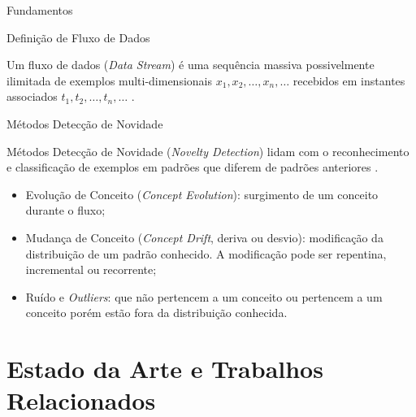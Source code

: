 \documentclass[aspectratio=1610,10pt]{beamer}
\begin{document}
\begin{frame}[fragile]{Fundamentos}
  \begin{block}{Definição de Fluxo de Dados}
    
    \vspace{1mm}

    Um fluxo de dados (\textit{Data Stream}) é uma sequência massiva possivelmente
    ilimitada de exemplos multi-dimensionais $x_1, x_2, \dots, x_n, \dots$
    recebidos em instantes associados $t_1, t_2, \dots, t_n, \dots$
    \cite{Aggarwal2003}.
  \end{block}

  \begin{alertblock}{Métodos Detecção de Novidade}
    
    \vspace{1mm}
    Métodos Detecção de Novidade (\emph{Novelty Detection}) lidam com o reconhecimento e
    classificação de exemplos em padrões que diferem de padrões anteriores
    \cite{Gama2010}.
    \begin{itemize}%
      
      \item Evolução de Conceito (\emph{Concept Evolution}): surgimento de um conceito durante
      o fluxo;
      
      \item Mudança de Conceito (\emph{Concept Drift}, deriva ou desvio): modificação da
      distribuição de um padrão conhecido. A modificação pode ser repentina,
      incremental ou recorrente;
      
      \item Ruído e \emph{Outliers}: que não pertencem a um conceito ou
      pertencem a um conceito porém estão fora da distribuição conhecida.
      
    \end{itemize}
  \end{alertblock}
\end{frame}


\section{Estado da Arte e Trabalhos Relacionados}

\newcommand{\arch}{IDSA-IoT\xspace}
\end{document}
